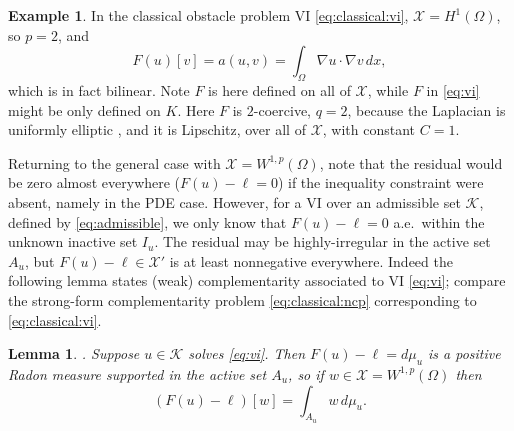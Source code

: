 \documentclass[]{interact}
\theoremstyle{plain}%
\newtheorem{lemma}[theorem]{Lemma}
\theoremstyle{definition}
\newtheorem{example}[theorem]{Example}
\theoremstyle{remark}
\newcommand{\grad}{\nabla}
\newcommand{\cK}{\mathcal{K}}
\newcommand{\cX}{\mathcal{X}}
\begin{document}
\begin{example}  \label{example:classicalobstacle}
In the classical obstacle problem VI \eqref{eq:classical:vi}, $\cX=H^1(\Omega)$, so $p=2$, and
\begin{equation} \label{eq:classical:bilinearform}
F(u)[v] = a(u,v) = \int_\Omega \grad u\cdot \grad v\,dx,
\end{equation}
which is in fact bilinear.  Note $F$ is here defined on all of $\cX$, while $F$ in \eqref{eq:vi} might be only defined on $K$.  Here $F$ is $2$-coercive, $q=2$, because the Laplacian is uniformly elliptic \cite{Evans2010}, and it is Lipschitz, over all of $\cX$, with constant $C=1$.
\end{example}

Returning to the general case with $\cX = W^{1,p}(\Omega)$, note that the residual would be zero almost everywhere ($F(u)-\ell=0$) if the inequality constraint were absent, namely in the PDE case.  However, for a VI over an admissible set $\cK$, defined by \eqref{eq:admissible}, we only know that $F(u)-\ell=0$ a.e.~within the unknown inactive set $I_u$.  The residual may be highly-irregular in the active set $A_u$, but $F(u)-\ell\in \cX'$ is at least nonnegative everywhere.  Indeed the following lemma states (weak) complementarity associated to VI \eqref{eq:vi}; compare the strong-form complementarity problem \eqref{eq:classical:ncp} corresponding to \eqref{eq:classical:vi}.

\begin{lemma} \cite[Theorem II.6.9]{KinderlehrerStampacchia1980}.  Suppose $u\in \cK$ solves \eqref{eq:vi}.  Then $F(u)-\ell=d\mu_u$ is a positive Radon measure supported in the active set $A_u$, so if $w\in\cX=W^{1,p}(\Omega)$ then
\begin{equation}
(F(u)-\ell)[w] = \int_{A_u} w\, d\mu_u. \label{eq:measure}
\end{equation}
\end{lemma}
\end{document}
